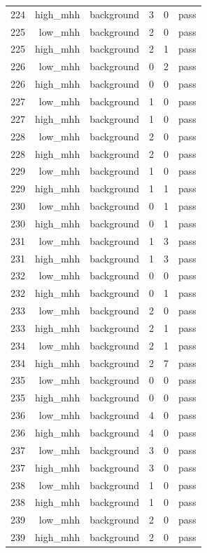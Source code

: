 \begin{table}[htbp]
{\begin{tabular}{lrrrrr}
224 & high\_mhh & background & 3 & 0 & pass \\
225 & low\_mhh & background & 2 & 0 & pass \\
225 & high\_mhh & background & 2 & 1 & pass \\
226 & low\_mhh & background & 0 & 2 & pass \\
226 & high\_mhh & background & 0 & 0 & pass \\
227 & low\_mhh & background & 1 & 0 & pass \\
227 & high\_mhh & background & 1 & 0 & pass \\
228 & low\_mhh & background & 2 & 0 & pass \\
228 & high\_mhh & background & 2 & 0 & pass \\
229 & low\_mhh & background & 1 & 0 & pass \\
229 & high\_mhh & background & 1 & 1 & pass \\
230 & low\_mhh & background & 0 & 1 & pass \\
230 & high\_mhh & background & 0 & 1 & pass \\
231 & low\_mhh & background & 1 & 3 & pass \\
231 & high\_mhh & background & 1 & 3 & pass \\
232 & low\_mhh & background & 0 & 0 & pass \\
232 & high\_mhh & background & 0 & 1 & pass \\
233 & low\_mhh & background & 2 & 0 & pass \\
233 & high\_mhh & background & 2 & 1 & pass \\
234 & low\_mhh & background & 2 & 1 & pass \\
234 & high\_mhh & background & 2 & 7 & pass \\
235 & low\_mhh & background & 0 & 0 & pass \\
235 & high\_mhh & background & 0 & 0 & pass \\
236 & low\_mhh & background & 4 & 0 & pass \\
236 & high\_mhh & background & 4 & 0 & pass \\
237 & low\_mhh & background & 3 & 0 & pass \\
237 & high\_mhh & background & 3 & 0 & pass \\
238 & low\_mhh & background & 1 & 0 & pass \\
238 & high\_mhh & background & 1 & 0 & pass \\
239 & low\_mhh & background & 2 & 0 & pass \\
239 & high\_mhh & background & 2 & 0 & pass \\

\end{tabular}}
\end{table}

